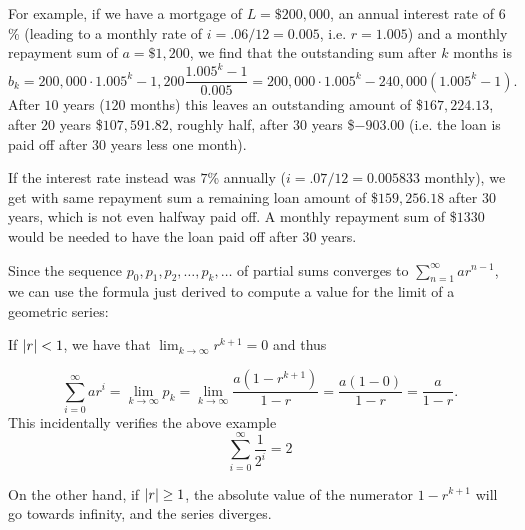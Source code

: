 For example, if we have a mortgage of $L=\$200,000$, an annual
interest rate of $6$\% (leading to a monthly rate of
$i=.06/12=0.005$, i.e. $r=1.005$) and a monthly repayment
sum of $a=\$1,200$, we find that the outstanding sum after
$k$ months is
\[
b_k=200,000\cdot{1.005^k}-1,200\frac{1.005^k-1}{0.005}
=200,000\cdot{1.005^k}-240,000\left(1.005^k-1\right).
\]
After $10$ years ($120$ months) this leaves an outstanding amount of
{\$}$167,224.13$, after $20$ years {\$}$107,591.82$, roughly
half, after $30$
years {\$}$-903.00$ (i.e. the loan is paid off after $30$ years less
one month).

If the interest rate instead was $7$\% annually ($i=.07/12=0.005833$
monthly), we get with same repayment sum a remaining loan amount of
{\$}$159,256.18$ after $30$ years, which is not even halfway paid
off. A monthly repayment sum of {\$}$1330$ would be
needed
to have the loan paid off after $30$ years.
\medskip

Since the sequence $p_0, p_{1}, p_{2},
\ldots, p_{k}, \ldots$ of partial sums converges to
$\displaystyle{\sum_{n=1}^{\infty} ar^{n-1}}$, we can use the
formula just derived to compute a value for the limit of a geometric series:

If $\left|r\right|<1$, we have that $\lim_{k\to\infty} r^{k+1}=0$ and thus

\[
\sum_{i=0}^{\infty} ar^i
=
\lim_{k\to\infty} p_k=
\lim_{k \rightarrow \infty} \frac{a (1-r^{k+1})}{1-r} =
\frac{a(1-0)}{1-r}=\frac{a}{1-r}.
\]
This incidentally verifies the above example
\[
\sum_{i=0}^\infty \frac{1}{2^i}=2
\]

On the other hand, if $\left|r\right|\ge 1$, the absolute value of the numerator
$1-r^{k+1}$ will go towards infinity, and the series diverges.


